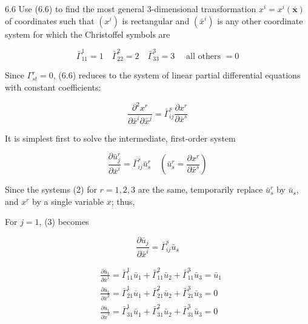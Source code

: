 \documentclass[10pt]{article}
\begin{document}
6.6 Use (6.6) to find the most general 3-dimensional transformation $x^{i}=x^{i}(\overline{\mathbf{x}})$ of coordinates such that $\left(x^{i}\right)$ is rectangular and $\left(\bar{x}^{i}\right)$ is any other coordinate system for which the Christoffel symbols are

$$
\bar{\Gamma}_{11}^{1}=1 \quad \bar{\Gamma}_{22}^{2}=2 \quad \bar{\Gamma}_{33}^{3}=3 \quad \text { all others }=0
$$

Since $\Gamma_{s t}^{r}=0$, (6.6) reduces to the system of linear partial differential equations with constant coefficients:


\begin{equation*}
\frac{\partial^{2} x^{r}}{\partial \bar{x}^{i} \partial \bar{x}^{j}}=\bar{\Gamma}_{i j}^{s} \frac{\partial x^{r}}{\partial \bar{x}^{s}} \tag{1}
\end{equation*}


It is simplest first to solve the intermediate, first-order system


\begin{equation*}
\frac{\partial \bar{u}_{j}^{r}}{\partial \bar{x}^{i}}=\bar{\Gamma}_{i j}^{s} \bar{u}_{s}^{r} \quad\left(\bar{u}_{s}^{r}=\frac{\partial x^{r}}{\partial \bar{x}^{s}}\right) \tag{2}
\end{equation*}


Since the systems (2) for $r=1,2,3$ are the same, temporarily replace $\bar{u}_{s}^{r}$ by $\bar{u}_{s}$, and $x^{r}$ by a single variable $x$; thus,

For $j=1$, (3) becomes


\begin{equation*}
\frac{\partial \bar{u}_{j}}{\partial \bar{x}^{i}}=\bar{\Gamma}_{i j}^{s} \bar{u}_{s} \tag{3}
\end{equation*}


$$
\begin{aligned}
& \frac{\partial \bar{u}_{1}}{\partial \bar{x}^{1}}=\bar{\Gamma}_{11}^{1} \bar{u}_{1}+\bar{\Gamma}_{11}^{2} \bar{u}_{2}+\bar{\Gamma}_{11}^{3} \bar{u}_{3}=\bar{u}_{1} \\
& \frac{\partial \bar{u}_{1}}{\partial \bar{x}^{2}}=\bar{\Gamma}_{21}^{1} \bar{u}_{1}+\bar{\Gamma}_{21}^{2} \bar{u}_{2}+\bar{\Gamma}_{21}^{3} \bar{u}_{3}=0 \\
& \frac{\partial \bar{u}_{1}}{\partial \bar{x}^{3}}=\bar{\Gamma}_{31}^{1} \bar{u}_{1}+\bar{\Gamma}_{31}^{2} \bar{u}_{2}+\bar{\Gamma}_{31}^{3} \bar{u}_{3}=0
\end{aligned}
$$
\end{document}

